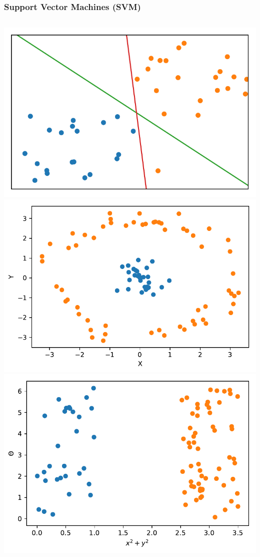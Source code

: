 \documentclass[aspectratio=169]{beamer}
\begin{document}
\begin{frame}
	\frametitle{Support Vector Machines (SVM)}
	\begin{columns}
		 \includegraphics[width=1.0\textwidth]{imgs/svm_2.pdf}
		\onslide<1-> \includegraphics[width=1.0\textwidth]{imgs/svm_3.pdf}
		\onslide<1-> \includegraphics[width=1.0\textwidth]{imgs/svm_4.pdf}

\end{columns}
\end{frame}
\end{document}
